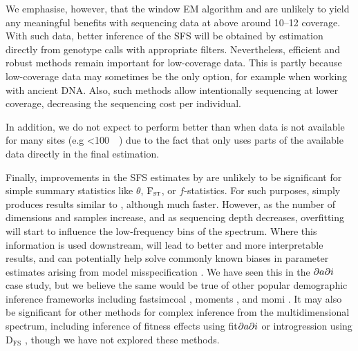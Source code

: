 We emphasise, however, that the window EM algorithm and \winsfs are unlikely to yield any meaningful benefits with sequencing data at above around \SIrange{10}{12}{\depth} coverage.
With such data, better inference of the SFS will be obtained by estimation directly from genotype calls with appropriate filters.
Nevertheless, efficient and robust methods remain important for low-coverage data.
This is partly because low-coverage data may sometimes be the only option, for example when working with ancient DNA.
Also, such methods allow intentionally sequencing at lower coverage, decreasing the sequencing cost per individual.

In addition, we do not expect \winsfs to perform better than \realsfs when data is not available for many sites (e.g \SI{<100}{\mega\bases}) due to the fact that \winsfs only uses parts of the available data directly in the final estimation.

Finally, improvements in the SFS estimates by \winsfs are unlikely to be significant for simple summary statistics like $\theta$, $\text{F}_{\textsc{st}}$, or $f$-statistics.
For such purposes, \winsfs simply produces results similar to \realsfs, although much faster. 
However, as the number of dimensions and samples increase, and as sequencing depth decreases, overfitting will start to influence the low-frequency bins of the spectrum.
Where this information is used downstream, \winsfs will lead to better and more interpretable results, and can potentially help solve commonly known biases in parameter estimates arising from model misspecification \cite{Momigliano2021}.
We have seen this in the $\partial a \partial i$ case study, but we believe the same would be true of other popular demographic inference frameworks including fastsimcoal \cite{Excoffier2011,Excoffier2013}, moments \cite{Jouganous2017}, and momi \cite{Kamm2017}.
It may also be significant for other methods for complex inference from the multidimensional spectrum, including inference of fitness effects using fit$\partial a \partial i$ \cite{Kim2017,Huang2021} or introgression using $\text{D}_{\text{FS}}$ \cite{Martin2020}, though we have not explored these methods.

